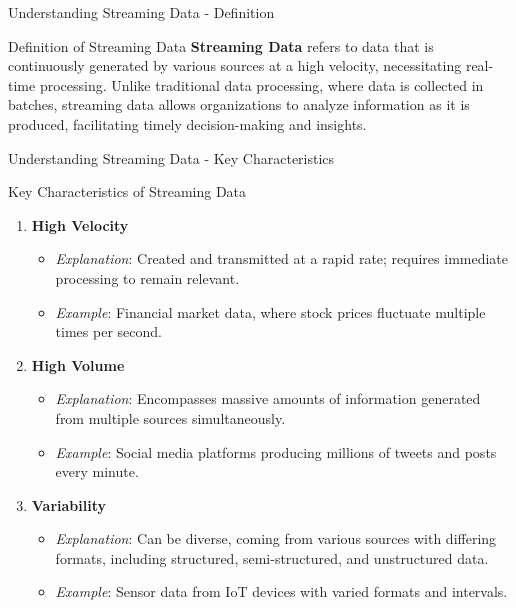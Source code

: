 \documentclass[aspectratio=169]{beamer}
\begin{document}
\begin{frame}[fragile]{Understanding Streaming Data - Definition}
    \begin{block}{Definition of Streaming Data}
        \textbf{Streaming Data} refers to data that is continuously generated by various sources at a high velocity, necessitating real-time processing. Unlike traditional data processing, where data is collected in batches, streaming data allows organizations to analyze information as it is produced, facilitating timely decision-making and insights.
    \end{block}
\end{frame}

\begin{frame}[fragile]{Understanding Streaming Data - Key Characteristics}
    \begin{block}{Key Characteristics of Streaming Data}
        \begin{enumerate}
            \item \textbf{High Velocity}
                \begin{itemize}
                    \item \textit{Explanation}: Created and transmitted at a rapid rate; requires immediate processing to remain relevant.
                    \item \textit{Example}: Financial market data, where stock prices fluctuate multiple times per second.
                \end{itemize}
                
            \item \textbf{High Volume}
                \begin{itemize}
                    \item \textit{Explanation}: Encompasses massive amounts of information generated from multiple sources simultaneously.
                    \item \textit{Example}: Social media platforms producing millions of tweets and posts every minute.
                \end{itemize}
                
            \item \textbf{Variability}
                \begin{itemize}
                    \item \textit{Explanation}: Can be diverse, coming from various sources with differing formats, including structured, semi-structured, and unstructured data.
                    \item \textit{Example}: Sensor data from IoT devices with varied formats and intervals.
                \end{itemize}
        \end{enumerate}
    \end{block}
\end{frame}
\end{document}

